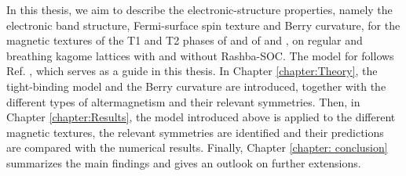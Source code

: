 In this thesis, we aim to describe the electronic-structure properties, namely the electronic band structure, Fermi-surface spin texture and Berry curvature, for the magnetic textures of the T1 and T2 phases of  and of  and , on regular and breathing kagome lattices with and without Rashba-SOC. The model for  follows Ref. \cite{Quelle3}, which serves as a guide in this thesis. 
In Chapter \ref{chapter:Theory}, the tight-binding model and the Berry curvature are introduced, together with the different types of altermagnetism and their relevant symmetries.
Then, in Chapter \ref{chapter:Results}, the model introduced above is applied to the different magnetic textures, the relevant symmetries are identified and
their predictions are compared with the numerical results.
Finally, Chapter \ref{chapter: conclusion} summarizes the main findings and gives an outlook on further extensions.\\






